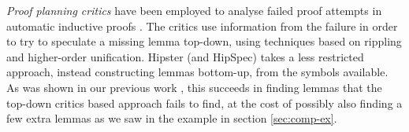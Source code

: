 \emph{Proof planning critics} have been employed to analyse failed
proof attempts in automatic inductive proofs \cite{productiveuse}. The
critics use information from the failure in order to try to speculate
a missing lemma top-down, using techniques based on rippling and
higher-order unification. Hipster (and HipSpec) takes a less
restricted approach, instead constructing lemmas bottom-up, from the symbols available. As was shown in our previous work \cite{hipspecCADE}, this succeeds in finding lemmas that the top-down critics based approach fails to find, at the cost of possibly also finding a few extra lemmas as we saw in the example in section \ref{sec:comp-ex}.




